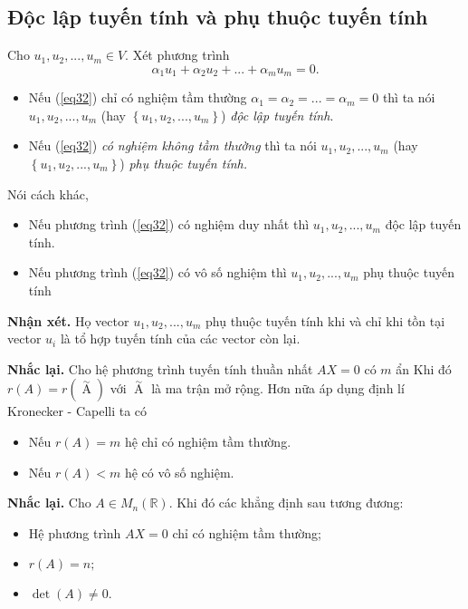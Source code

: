 \subsection{Độc lập tuyến tính và phụ thuộc tuyến tính}
Cho $u_1, u_2, ..., u_m \in V.$ Xét phương trình
\begin{equation}
{\alpha _1}{u_1} + {\alpha _2}{u_2} + ... + {\alpha _m}{u_m} = 0.
\label{eq32}
\end{equation}
\begin{itemize}
\item Nếu (\ref{eq32}) chỉ có nghiệm tầm thường $\alpha_1 = \alpha_2 = ... = \alpha_m = 0$ thì ta nói $u_1, u_2, ..., u_m$ (hay $\left\{ {u_1, u_2, ..., u_m} \right\}$) \textit{độc lập tuyến tính}.
\item Nếu (\ref{eq32}) \textit{có nghiệm không tầm thường} thì ta nói $u_1, u_2, ..., u_m$ (hay $\left\{ {u_1, u_2, ..., u_m} \right\}$) \textit{phụ thuộc tuyến tính.}
\end{itemize} 
Nói cách khác,
\begin{itemize}
\item Nếu phương trình (\ref{eq32}) có nghiệm duy nhất thì  $u_1, u_2, ..., u_m$ độc lập tuyến tính.
\item Nếu phương trình (\ref{eq32}) có vô số nghiệm thì  $u_1, u_2, ..., u_m$ phụ thuộc tuyến tính
\end{itemize}
\begin{mybox}
\textbf{Nhận xét.} Họ vector $u_1, u_2, ..., u_m$ phụ thuộc tuyến tính khi và chỉ khi tồn tại vector $u_i$ là tổ hợp tuyến tính của các vector còn lại.
\end{mybox}
\begin{mybox}
\textbf{Nhắc lại.} Cho hệ phương trình tuyến tính thuần nhất $AX = 0$ có $m$ ẩn Khi đó $r\left( A \right) = r\left( {\mathop A\limits^ \sim  } \right)$ với $\mathop A\limits ^\sim$ là ma trận mở rộng. Hơn nữa áp dụng định lí Kronecker - Capelli ta có
\begin{itemize}
\item Nếu $r \left( A \right) = m$ hệ chỉ có nghiệm tầm thường.
\item Nếu $r \left( A \right) < m$ hệ có vô số nghiệm.
\end{itemize}
\end{mybox}
\textbf{Nhắc lại.} Cho $A \in M_n \left( {\mathbb{R}} \right).$ Khi đó các khẳng định sau tương đương:
\begin{itemize}
\item Hệ phương trình $AX = 0$ chỉ có nghiệm tầm thường;
\item $r \left( A \right) = n;$
\item $\det \left( A \right) \ne 0.$
\end{itemize}
